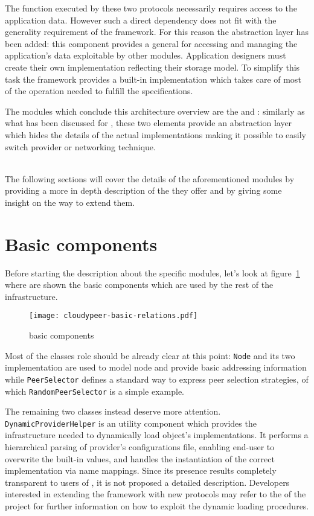 The function executed by these two protocols necessarily requires
access to the application data. However such a direct dependency
does not fit with
the generality requirement of the framework. For this reason the
\store abstraction layer has been added: this component provides a general
\api for accessing and managing the application's data exploitable by
other modules.
Application designers must create their own \store implementation
reflecting their storage model. To simplify this task the framework
provides a built-in implementation which takes care of most of the
operation needed to fulfill the \api specifications.

The modules which conclude this architecture overview are the
\cloudhelper and \networkhelper: similarly as what has been discussed for
\grapes, these two elements provide an abstraction layer which hides
the details of the actual implementations making it possible
to easily switch \cloud provider or networking technique.

\ \\
The following sections will cover the details of the aforementioned
modules by providing a more in depth description of the \api they
offer and by giving some insight on the way to extend them.

\section{Basic components}
Before starting the description about the specific modules, let's look
at figure~\ref{fig:cloudypeer-basic-relations} where are shown the
basic components which are used by the rest of the \cloudypeer
infrastructure.

\begin{figure}[h!]
  \centering
  \texttt{[image: cloudypeer-basic-relations.pdf]}
  \caption{\cloudypeer basic components}
  \label{fig:cloudypeer-basic-relations}
\end{figure}

Most of the classes role should be already clear at this point:
\texttt{Node} and its two implementation are used to model
node \descriptors and provide basic addressing information while
\texttt{PeerSelector} defines a standard way to express
peer selection strategies, of which \texttt{RandomPeerSelector} is a
simple example.

The remaining two classes instead deserve more attention.
\texttt{DynamicProviderHelper} is an utility component which
provides the infrastructure needed to dynamically load object's
implementations. It performs a hierarchical parsing of provider's
configurations file, enabling end-user to overwrite the built-in
values, and handles the instantiation of the correct
implementation via name mappings. Since its presence results completely
transparent to users of \cloudypeer, it is not proposed a detailed
description. Developers interested in extending the
framework with new protocols may refer to the \javadoc of the project
for further information on how to exploit the dynamic loading procedures.

